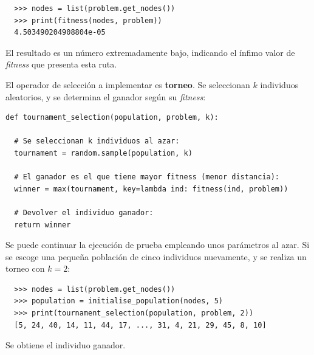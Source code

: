 \begin{verbatim}
  >>> nodes = list(problem.get_nodes())
  >>> print(fitness(nodes, problem))
  4.503490204908804e-05
\end{verbatim}

El resultado es un número extremadamente bajo, indicando el ínfimo valor de \textit{fitness} que presenta esta ruta.

El operador de selección a implementar es \textbf{torneo}. Se seleccionan $k$ individuos aleatorios, y se determina el 
ganador según su \textit{fitness}:
\newline
\begin{lstlisting}[style=PythonStyle]
def tournament_selection(population, problem, k):

  # Se seleccionan k individuos al azar:
  tournament = random.sample(population, k)

  # El ganador es el que tiene mayor fitness (menor distancia):
  winner = max(tournament, key=lambda ind: fitness(ind, problem))

  # Devolver el individuo ganador:
  return winner
\end{lstlisting}

Se puede continuar la ejecución de prueba empleando unos parámetros al azar. Si se escoge una pequeña población de cinco
individuos nuevamente, y se realiza un torneo con $k=2$:

\begin{verbatim}
  >>> nodes = list(problem.get_nodes())      
  >>> population = initialise_population(nodes, 5)
  >>> print(tournament_selection(population, problem, 2))
  [5, 24, 40, 14, 11, 44, 17, ..., 31, 4, 21, 29, 45, 8, 10]
\end{verbatim}

Se obtiene el individuo ganador.

